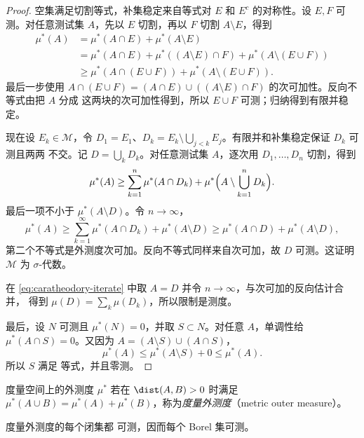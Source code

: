 \begin{proof}
空集满足切割等式，补集稳定来自等式对 $E$ 和 $E^c$ 的对称性。设 $E,F$ 可测。对任意测试集
$A$，先以 $E$ 切割，再以 $F$ 切割 $A\setminus E$，得到
\[
\begin{aligned}
 \mu^*(A)
 &=\mu^*(A\cap E)+\mu^*(A\setminus E)\\
 &=\mu^*(A\cap E)+\mu^*((A\setminus E)\cap F)
   +\mu^*(A\setminus(E\cup F))\\
 &\ge \mu^*(A\cap(E\cup F))+\mu^*(A\setminus(E\cup F)).
\end{aligned}
\]
最后一步使用
$A\cap(E\cup F)=(A\cap E)\cup((A\setminus E)\cap F)$ 的次可加性。反向不等式由把 $A$ 分成
这两块的次可加性得到，所以 $E\cup F$ 可测；归纳得到有限并稳定。

现在设 $E_k\in\mathcal M$，令
$D_1=E_1$、$D_k=E_k\setminus\bigcup_{j<k}E_j$。有限并和补集稳定保证 $D_k$ 可测且两两
不交。记 $D=\bigcup_kD_k$。对任意测试集 $A$，逐次用 $D_1,\dots,D_n$ 切割，得到
\[
 \mu^*(A)\ge
 \sum_{k=1}^n\mu^*(A\cap D_k)
 +\mu^*\Bigl(A\setminus\bigcup_{k=1}^nD_k\Bigr).
 \label{eq:caratheodory-iterate}
\]
最后一项不小于 $\mu^*(A\setminus D)$。令 $n\to\infty$，
\[
 \mu^*(A)\ge\sum_{k=1}^{\infty}\mu^*(A\cap D_k)+\mu^*(A\setminus D)
 \ge\mu^*(A\cap D)+\mu^*(A\setminus D),
\]
第二个不等式是外测度次可加。反向不等式同样来自次可加，故 $D$ 可测。这证明 $\mathcal M$
为 $\sigma$-代数。

在 \eqref{eq:caratheodory-iterate} 中取 $A=D$ 并令 $n\to\infty$，与次可加的反向估计合并，
得到 $\mu(D)=\sum_k\mu(D_k)$，所以限制是测度。

最后，设 $N$ 可测且 $\mu^*(N)=0$，并取 $S\subset N$。对任意 $A$，单调性给
$\mu^*(A\cap S)=0$。又因为
$A=(A\setminus S)\cup(A\cap S)$，
\[
 \mu^*(A)\le\mu^*(A\setminus S)+0\le\mu^*(A).
\]
所以 $S$ 满足 \Caratheodory{} 等式，并且零测。
\end{proof}

\begin{definition}[度量外测度]\label{def:2-1-2-4}
度量空间上的外测度 $\mu^*$ 若在 $\dist(A,B)>0$ 时满足
$\mu^*(A\cup B)=\mu^*(A)+\mu^*(B)$，称为\emph{度量外测度}（metric outer measure）。
\end{definition}

\begin{proposition}\label{proposition:2-1-2-3}
度量外测度的每个闭集都 \Caratheodory{} 可测，因而每个 Borel 集可测。
\end{proposition}

